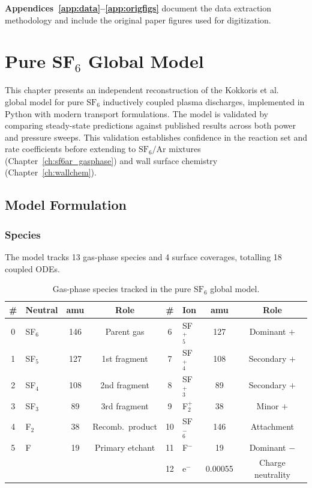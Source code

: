 \documentclass[11pt,a4paper]{report}
\newcommand{\SFsix}{\mathrm{SF}_6}
\newcommand{\Ar}{\mathrm{Ar}}
\begin{document}
\textbf{Appendices~\ref{app:data}--\ref{app:origfigs}} document the data extraction methodology and include the original paper figures used for digitization.


\chapter{Pure SF\texorpdfstring{$_6$}{6} Global Model}
\label{ch:pure_sf6}

This chapter presents an independent reconstruction of the Kokkoris et al.~\cite{Kokkoris2009} global model for pure $\SFsix$ inductively coupled plasma discharges, implemented in Python with modern transport formulations.  The model is validated by comparing steady-state predictions against published results across both power and pressure sweeps.  This validation establishes confidence in the reaction set and rate coefficients before extending to $\SFsix/\Ar$ mixtures (Chapter~\ref{ch:sf6ar_gasphase}) and wall surface chemistry (Chapter~\ref{ch:wallchem}).

\section{Model Formulation}
\label{sec:pure_formulation}

\subsection{Species}
\label{sec:pure_species}

The model tracks 13 gas-phase species and 4 surface coverages, totalling 18 coupled ODEs.

\begin{table}[H]
\centering\small
\caption{Gas-phase species tracked in the pure $\SFsix$ global model.}
\label{tab:pure_species}
\begin{tabular}{clcc|clcc}
\toprule
\textbf{\#} & \textbf{Neutral} & \textbf{amu} & \textbf{Role} & \textbf{\#} & \textbf{Ion} & \textbf{amu} & \textbf{Role} \\
\midrule
0 & SF$_6$ & 146 & Parent gas & 6 & SF$_5^+$ & 127 & Dominant $+$ \\
1 & SF$_5$ & 127 & 1st fragment & 7 & SF$_4^+$ & 108 & Secondary $+$ \\
2 & SF$_4$ & 108 & 2nd fragment & 8 & SF$_3^+$ & 89 & Secondary $+$ \\
3 & SF$_3$ & 89 & 3rd fragment & 9 & F$_2^+$ & 38 & Minor $+$ \\
4 & F$_2$ & 38 & Recomb.\ product & 10 & SF$_6^-$ & 146 & Attachment \\
5 & F & 19 & Primary etchant & 11 & F$^-$ & 19 & Dominant $-$ \\
 & & & & 12 & e$^-$ & 0.00055 & Charge neutrality \\
\bottomrule
\end{tabular}
\end{table}
\end{document}
